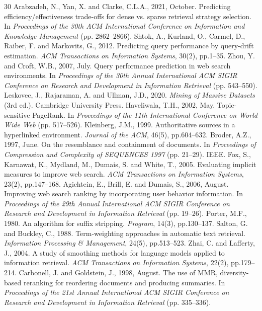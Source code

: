 \documentclass[conference]{IEEEtran}
\begin{document}
\begin{thebibliography}{30}
 Arabzadeh, N., Yan, X. and Clarke, C.L.A., 2021, October. Predicting efficiency/effectiveness trade-offs for dense vs. sparse retrieval strategy selection. In \textit{Proceedings of the 30th ACM International Conference on Information and Knowledge Management} (pp. 2862--2866).
 Shtok, A., Kurland, O., Carmel, D., Raiber, F. and Markovits, G., 2012. Predicting query performance by query-drift estimation. \textit{ACM Transactions on Information Systems}, 30(2), pp.1--35.
 Zhou, Y. and Croft, W.B., 2007, July. Query performance prediction in web search environments. In \textit{Proceedings of the 30th Annual International ACM SIGIR Conference on Research and Development in Information Retrieval} (pp. 543--550).
 Leskovec, J., Rajaraman, A. and Ullman, J.D., 2020. \textit{Mining of Massive Datasets} (3rd ed.). Cambridge University Press.
 Haveliwala, T.H., 2002, May. Topic-sensitive PageRank. In \textit{Proceedings of the 11th International Conference on World Wide Web} (pp. 517--526).
 Kleinberg, J.M., 1999. Authoritative sources in a hyperlinked environment. \textit{Journal of the ACM}, 46(5), pp.604--632.
 Broder, A.Z., 1997, June. On the resemblance and containment of documents. In \textit{Proceedings of Compression and Complexity of SEQUENCES 1997} (pp. 21--29). IEEE.
 Fox, S., Karnawat, K., Mydland, M., Dumais, S. and White, T., 2005. Evaluating implicit measures to improve web search. \textit{ACM Transactions on Information Systems}, 23(2), pp.147--168.
 Agichtein, E., Brill, E. and Dumais, S., 2006, August. Improving web search ranking by incorporating user behavior information. In \textit{Proceedings of the 29th Annual International ACM SIGIR Conference on Research and Development in Information Retrieval} (pp. 19--26).
 Porter, M.F., 1980. An algorithm for suffix stripping. \textit{Program}, 14(3), pp.130--137.
 Salton, G. and Buckley, C., 1988. Term-weighting approaches in automatic text retrieval. \textit{Information Processing \& Management}, 24(5), pp.513--523.
 Zhai, C. and Lafferty, J., 2004. A study of smoothing methods for language models applied to information retrieval. \textit{ACM Transactions on Information Systems}, 22(2), pp.179--214.
 Carbonell, J. and Goldstein, J., 1998, August. The use of MMR, diversity-based reranking for reordering documents and producing summaries. In \textit{Proceedings of the 21st Annual International ACM SIGIR Conference on Research and Development in Information Retrieval} (pp. 335--336).

\end{thebibliography}
\end{document}
